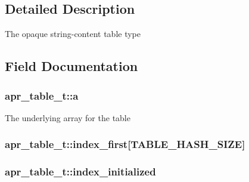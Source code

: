 \subsection{Detailed Description}
The opaque string-\/content table type 

\subsection{Field Documentation}
\subsubsection[{\texorpdfstring{a}{a}}]{ apr\+\_\+table\+\_\+t\+::a}\hypertarget{structapr__table__t_aed61d856f36189af31f74303f6637d4a}{}\label{structapr__table__t_aed61d856f36189af31f74303f6637d4a}
The underlying array for the table 
\subsubsection[{\texorpdfstring{index\+\_\+first}{index_first}}]{ apr\+\_\+table\+\_\+t\+::index\+\_\+first\mbox{[}{\bf T\+A\+B\+L\+E\+\_\+\+H\+A\+S\+H\+\_\+\+S\+I\+ZE}\mbox{]}}\hypertarget{structapr__table__t_ac2f6d9a430b665cd0efacf5de7dba7e8}{}\label{structapr__table__t_ac2f6d9a430b665cd0efacf5de7dba7e8}
\subsubsection[{\texorpdfstring{index\+\_\+initialized}{index_initialized}}]{ apr\+\_\+table\+\_\+t\+::index\+\_\+initialized}\hypertarget{structapr__table__t_a52a95dfc523ae09ce1ef5c522f1a3225}{}\label{structapr__table__t_a52a95dfc523ae09ce1ef5c522f1a3225}

